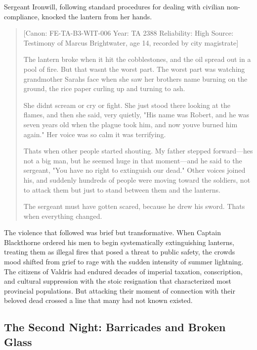 Sergeant Ironwill, following standard procedures for dealing with
civilian non-compliance, knocked the lantern from her hands.

\begin{quote}
{[}Canon: FE-TA-B3-WIT-006 \textbar{} Year: TA 2388 \textbar{}
Reliability: High \textbar{} Source: Testimony of Marcus Brightwater,
age 14, recorded by city magistrate{]}

The lantern broke when it hit the cobblestones, and the oil spread out
in a pool of fire. But that wasn\textquotesingle t the worst part. The
worst part was watching grandmother Sarah\textquotesingle s face when
she saw her brother\textquotesingle s name burning on the ground, the
rice paper curling up and turning to ash.

She didn\textquotesingle t scream or cry or fight. She just stood there
looking at the flames, and then she said, very quietly, "His name was
Robert, and he was seven years old when the plague took him, and now
you\textquotesingle ve burned him again." Her voice was so calm it was
terrifying.

That\textquotesingle s when other people started shouting. My father
stepped forward---he\textquotesingle s not a big man, but he seemed huge
in that moment---and he said to the sergeant, "You have no right to
extinguish our dead." Other voices joined his, and suddenly hundreds of
people were moving toward the soldiers, not to attack them but just to
stand between them and the lanterns.

The sergeant must have gotten scared, because he drew his sword.
That\textquotesingle s when everything changed.
\end{quote}

The violence that followed was brief but transformative. When Captain
Blackthorne ordered his men to begin systematically extinguishing
lanterns, treating them as illegal fires that posed a threat to public
safety, the crowd\textquotesingle s mood shifted from grief to rage with
the sudden intensity of summer lightning. The citizens of Valdris had
endured decades of imperial taxation, conscription, and cultural
suppression with the stoic resignation that characterized most
provincial populations. But attacking their moment of connection with
their beloved dead crossed a line that many had not known existed.

\subsection{The Second Night: Barricades and Broken
Glass}\label{the-second-night-barricades-and-broken-glass}

